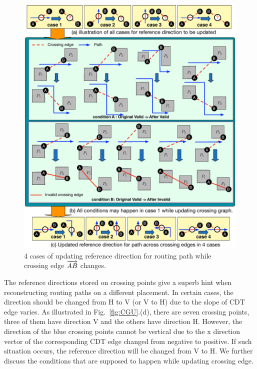     \begin{figure}[t]
      \begin{center}
        \includegraphics[width=\textwidth]{Fig/dirch.eps}
        \caption{4 cases of updating reference direction for routing path while crossing edge $\protect\overrightarrow{AB}$ changes.}
        \label{fig:dirch}
      \end{center}
    \end{figure}

    The reference directions stored on crossing points give a superb hint when reconstructing routing paths on a different placement.
    In certain cases, the direction should be changed from H to V (or V to H) due to the slope of CDT edge varies. As illustrated in Fig.~\ref{fig:CGU}.(d), there are seven crossing points, three of them have direction V and the others have direction H. However, the direction of the blue crossing points cannot be vertical due to the x direction vector of the corresponding CDT edge changed from negative to positive. If such situation occurs, the reference direction will be changed from V to H. We further discuss the conditions that are supposed to happen while updating crossing edge.

